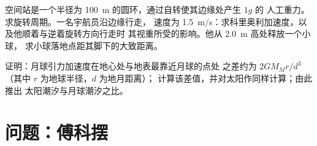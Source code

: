 \begin{exercise}[$\star\star\star$]\label{exo:b1:non-inertial-frames:11}
空间站是一个半径为 \qty{100}{m} 的圆环，通过自转使其边缘处产生 $1g$ 的
人工重力。求旋转周期。一名宇航员沿边缘行走，
速度为 \qty{1.5}{m/s}：求科里奥利加速度，以及他顺着与逆着旋转方向行走时
其视重所受的影响。他从 \qty{2.0}{m} 高处释放一个小球，
求小球落地点距其脚下的大致距离。
\end{exercise}

\begin{exercise}[$\star\star\star$]\label{exo:b1:non-inertial-frames:12}
证明：月球引力加速度在地心处与地表最靠近月球的点处
之差约为
$2GM_Mr/d^3$（其中 $r$ 为地球半径，$d$ 为地月距离）；
计算该差值，并对太阳作同样计算；由此推出
太阳潮汐与月球潮汐之比。
\end{exercise}

\section{问题：傅科摆}

